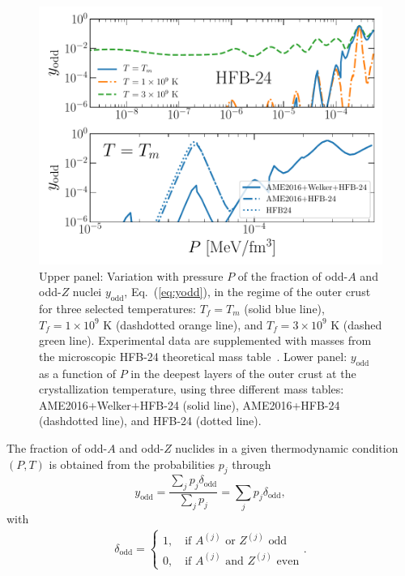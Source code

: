 \begin{figure}[!t]
  \begin{center}
    \includegraphics[width=0.9\linewidth]{figures/yodd_ocrust.pdf}
  \end{center}
  \caption[Fraction of odd-$A$ and odd-$Z$ nuclei versus pressure in the outer 
  crust regime]{
    Upper panel: Variation with pressure $P$ of the fraction of odd-$A$ and 
    odd-$Z$ nuclei $y_{\text{odd}}$, Eq.~(\ref{eq:yodd}), in the regime of the 
    outer crust for three selected
    temperatures: $T_f=T_m$ (solid blue line),
    $T_f=1\times 10^9$ K (dashdotted orange line), and 
    $T_f=3\times 10^9$ K (dashed green line).
    Experimental data are supplemented with masses from the microscopic 
  HFB-24 theoretical mass table~\cite{Goriely2013}. Lower panel:
$y_{\text{odd}}$ as a function of $P$ in the deepest layers of the outer crust
at the crystallization temperature, using three different mass tables:
AME2016+Welker+HFB-24 (solid line), AME2016+HFB-24 (dashdotted line), and
HFB-24 (dotted line).}\label{fig:qimp_ocrust}
\end{figure}

The fraction of odd-$A$ and odd-$Z$ nuclides in a given thermodynamic condition 
$(P,T)$ is obtained from the probabilities $p_j$ through
%
\begin{equation}
  y_{\text{odd}} = \frac{\sum_{j} p_j \delta_{\text{odd}}}{\sum_j p_j} 
  = \sum_j p_j\delta_{\text{odd}},\label{eq:yodd}
\end{equation}
%
with
%
\begin{eqnarray}
  \delta_{\text{odd}} =\left\{
                \begin{array}{ll}
                  1, \quad \text{if $A^{(j)}$ or $Z^{(j)}$ odd}\\
                  0, \quad \text{if $A^{(j)}$ and $Z^{(j)}$ even}
                \end{array}
              \right..
\end{eqnarray}
%

